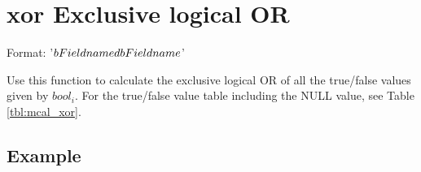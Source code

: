 
%

\section{xor Exclusive logical OR\label{sect:xor}}
Format: '$b{Fieldname}^^$b{Fieldname}$'

Use this function to calculate the exclusive logical OR of all the true/false values given by $bool_i$.
For the true/false value table including the NULL value, see Table \ref{tbl:mcal_xor}.

\subsection*{Example}


%
